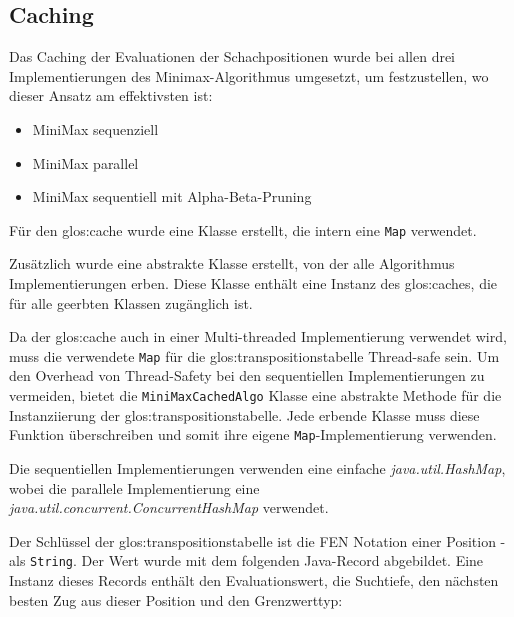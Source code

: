 \newpage

\subsection{Caching}
Das Caching der Evaluationen der Schachpositionen wurde bei allen drei Implementierungen des Minimax-Algorithmus umgesetzt, um festzustellen, wo dieser Ansatz am effektivsten ist:
\begin{itemize}
    \item MiniMax sequenziell
    \item MiniMax parallel
    \item MiniMax sequentiell mit Alpha-Beta-Pruning
\end{itemize}

Für den \gls{glos:cache} wurde eine Klasse erstellt, die intern eine \texttt{Map} verwendet.


Zusätzlich wurde eine abstrakte Klasse erstellt, von der alle Algorithmus Implementierungen erben.
Diese Klasse enthält eine Instanz des \glspl{glos:cache}, die für alle geerbten Klassen zugänglich ist.

Da der \gls{glos:cache} auch in einer Multi-threaded Implementierung verwendet wird, muss die verwendete \texttt{Map} für die \gls{glos:transpositionstabelle} Thread-safe sein.
Um den Overhead von Thread-Safety bei den sequentiellen Implementierungen zu vermeiden, bietet die \texttt{MiniMaxCachedAlgo} Klasse eine abstrakte Methode für die Instanziierung der \gls{glos:transpositionstabelle}.
Jede erbende Klasse muss diese Funktion überschreiben und somit ihre eigene \texttt{Map}-Implementierung verwenden.

Die sequentiellen Implementierungen verwenden eine einfache \textit{java.util.HashMap}, wobei die parallele Implementierung eine \textit{java.util.concurrent.ConcurrentHashMap} verwendet.

Der Schlüssel der \gls{glos:transpositionstabelle} ist die FEN Notation einer Position - als \texttt{String}.
Der Wert wurde mit dem folgenden Java-Record abgebildet.
Eine Instanz dieses Records enthält den Evaluationswert, die Suchtiefe, den nächsten besten Zug aus dieser Position und den Grenzwerttyp:


